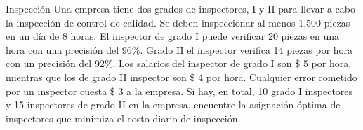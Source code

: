 \begin{frameExample}{Inspección}{}
Una empresa tiene dos grados de inspectores, I y II para llevar a cabo la inspección de control de calidad. Se deben inspeccionar al menos 1,500 piezas en un día de 8 horas. El inspector de grado I puede verificar 20 piezas en una hora con una precisión del 96\%. Grado II el inspector verifica 14 piezas por hora con un precisión del 92\%. Los salarios del inspector de grado I son \$ 5 por hora, mientras que los de grado II inspector son \$ 4 por hora. Cualquier error cometido por un inspector cuesta \$ 3 a la empresa. Si hay, en total, 10 grado I
inspectores y 15 inspectores de grado II en la empresa, encuentre la asignación óptima de inspectores que minimiza el costo diario de inspección.
    
\end{frameExample}



